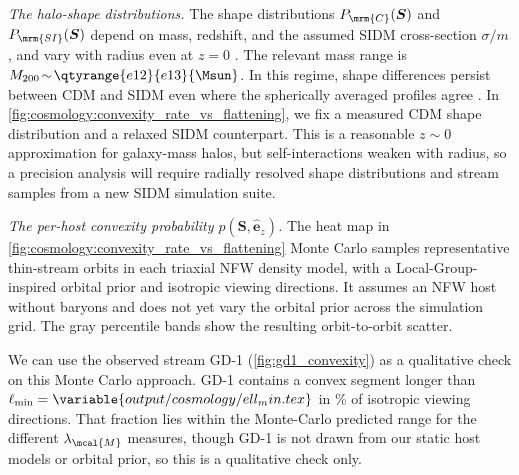 \documentclass[linenumbers,twocolumn]{aastex701}
\renewcommand{\mbf}[1]{\boldsymbol{#1}}
\newcommand{\zhat}{\hat{\mbf{e}}_z} %
\newcommand{\lamM}{\ensuremath{\lambda_{\mcal{M}}}}   %
\begin{document}
        \emph{The halo-shape distributions.} %
            The shape distributions $P_{\mrm{C}}(\mbf{S})$ and $P_{\mrm{SI}}(\mbf{S})$ depend on mass, redshift, and the assumed \gls{SIDM} cross-section $\sigma/m$, and vary with radius even at $z=0$ \citep{Vera-Ciro+:2011:ShapeDarkMatter}. %
            The relevant mass range is $M_{200}\!\sim\!\qtyrange{e12}{e13}{\Msun}$. %
            In this regime, shape differences persist between \gls{CDM} and \gls{SIDM} even where the spherically averaged profiles agree \citep{Bautista+:2025:JeansModelShapes,Giocoli+:2026:AIDATNGProject3D}. %
            In \cref{fig:cosmology:convexity_rate_vs_flattening}, we fix a measured \gls{CDM} shape distribution and a relaxed \gls{SIDM} counterpart. %
            This is a reasonable $z\!\sim\!0$ approximation for galaxy-mass halos, but self-interactions weaken with radius, so a precision analysis will require radially resolved shape distributions and stream samples from a new \gls{SIDM} simulation suite. %

        \emph{The per-host convexity probability $p(\mbf{S},\zhat)$.} %
            The heat map in \cref{fig:cosmology:convexity_rate_vs_flattening} Monte Carlo samples representative thin-stream orbits in each triaxial \gls{NFW} density model, with a Local-Group-inspired orbital prior and isotropic viewing directions. %
            It assumes an \gls{NFW} host without baryons and does not yet vary the orbital prior across the simulation grid. %
            The gray percentile bands show the resulting orbit-to-orbit scatter. %

            We can use the observed stream GD-1 (\autoref{fig:gd1_convexity}) as a qualitative check on this Monte Carlo approach. %
            GD-1 contains a convex segment longer than $\ell_{\min}=\variable{output/cosmology/ell_min.tex}$ in \% of  isotropic viewing directions. %
            That fraction lies within the Monte-Carlo predicted range for the different $\lamM$ measures, though GD-1 is not drawn from our static host models or orbital prior, so this is a qualitative check only. %
\end{document}
